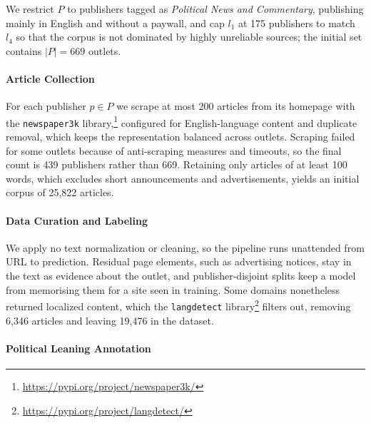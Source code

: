 \documentclass[runningheads]{llncs}
\begin{document}
We restrict \(P\) to publishers tagged as \emph{Political News and Commentary}, publishing mainly in English and without a paywall, and cap $l_1$ at 175 publishers to match $l_4$ so that the corpus is not dominated by highly unreliable sources; the initial set contains \(|P| = 669\) outlets.

\paragraph{Article Collection}
\label{sec:dataCollection}

For each publisher \(p \in P\) we scrape at most 200 articles from its homepage with the \texttt{newspaper3k} library,\footnote{\url{https://pypi.org/project/newspaper3k/}} configured for English-language content and duplicate removal, which keeps the representation balanced across outlets. Scraping failed for some outlets because of anti-scraping measures and timeouts, so the final count is 439 publishers rather than 669. Retaining only articles of at least 100 words, which excludes short announcements and advertisements, yields an initial corpus of 25,822 articles.

\paragraph{Data Curation and Labeling}
\label{sec:datacleaning}

We apply no text normalization or cleaning, so the pipeline runs unattended from URL to prediction. Residual page elements, such as advertising notices, stay in the text as evidence about the outlet, and publisher-disjoint splits keep a model from memorising them for a site seen in training. Some domains nonetheless returned localized content, which the \texttt{langdetect} library\footnote{\url{https://pypi.org/project/langdetect/}} filters out, removing 6,346 articles and leaving 19,476 in the dataset.

\paragraph{Political Leaning Annotation}
\label{sec:politicalLeaningDataset}
\end{document}
